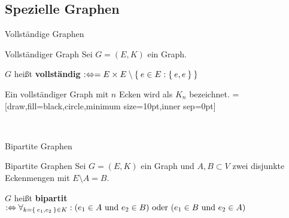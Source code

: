 \subsection{Spezielle Graphen}
\begin{frame}{Vollständige Graphen}
\begin{block}{Vollständiger Graph}
Sei $G = (E, K)$ ein Graph.

$G$ heißt \textbf{vollständig} $:\Leftrightarrow  = E \times E \setminus \Set{e \in E: \Set{e, e}}$
\end{block}

Ein vollständiger Graph mit $n$ Ecken wird als $K_n$ bezeichnet.
\pause
{}=[draw,fill=black,circle,minimum size=10pt,inner sep=0pt]
\begin{gallery}
    \\
\end{gallery}
\end{frame}

\begin{frame}{Bipartite Graphen}
\begin{block}{Bipartite Graphen}
Sei $G = (E, K)$ ein Graph und $A, B \subset V$ zwei disjunkte Eckenmengen mit
$E \setminus A = B$.

$G$ heißt \textbf{bipartit} $:\Leftrightarrow \forall_{k = \Set{e_1, e_2} \in K}: (e_1 \in A \text{ und } e_2 \in B) \text{ oder } (e_1 \in B \text{ und } e_2 \in A) $
\end{block}

\begin{gallery}
    \\
\end{gallery}
\end{frame}

